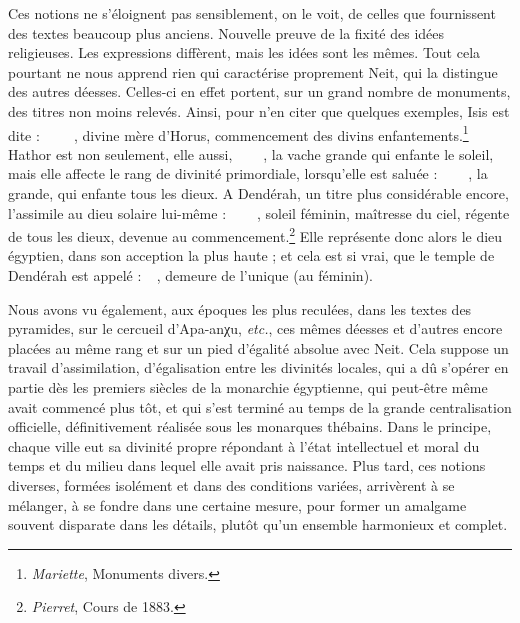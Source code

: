 \documentclass[letterpaper,twocolumn,openany,nodeprecatedcode]{dndbook}
\newcommand*\hieroAAAG{}
\newcommand*\hieroAAAH{}
\newcommand*\hieroAABC{\raisebox{0.5ex}{}}
\newcommand*\hieroAACB{\raisebox{0.5ex}{}}
\newcommand*\hieroAACN{\raisebox{1ex}{}}
\newcommand*\hieroAACS{}
\newcommand*\hieroAAEK{}
\newcommand*\hieroAAHN{}
\newcommand*\hieroAAII{}
\newcommand*\hieroAAKH{}
\newcommand*\hieroAAKO{}
\newcommand*\hieroAALA{}
\newcommand*\hieroAAMP{}
\newcommand*\hieroAANA{}
\newcommand*\hieroAANB{}
\newcommand*\hieroAANC{}
\newcommand*\hieroAANP{}
\newcommand*\hieroAAON{}
\newcommand*\hieroAAPH{}
\newcommand*\hieroAAXQ{\raisebox{0.5ex}{}}
\newcommand*\hieroAAZI{}
\newcommand*\hieroAAZN{}
\newcommand*\hieroABAM{}
\newcommand*\hieroABAN{}
\newcommand*\hieroABAO{}
\newcommand*\hieroABAP{}
\newcommand*\hieroABAQ{}
\newcommand*\hieroABAR{}
\newcommand*\hieroABAS{}
\newcommand*\hieroABAT{}
\newcommand*\hieroABAU{\raisebox{0.5ex}{}}
\begin{document}
Ces notions ne s'éloignent pas sensiblement, on le voit, de celles que fournissent des textes beaucoup plus anciens. Nouvelle preuve de la fixité des idées religieuses. Les expressions diffèrent, mais les idées sont les mêmes. Tout cela pourtant ne nous apprend rien qui caractérise proprement Neit, qui la distingue des autres déesses. Celles-ci en effet portent, sur un grand nombre de monuments, des titres non moins relevés. Ainsi, pour n'en citer que quelques exemples, Isis est dite : $\hieroAAEK\:\hieroAAKO\:\hieroAACN\allowbreak\:\hieroAAON\:\hieroAAEK\:\hieroABAM\allowbreak\:\hieroAAMP\:\hieroAAEK\allowbreak\:\hieroAANC\:\hieroABAN$, divine mère d'Horus, commencement des divins enfantements.\footnote{\emph{Mariette}, Monuments divers.} Hathor est non seulement, elle aussi, $\hieroAAAH\:\hieroAANA\:\hieroAANB\allowbreak\:\hieroAAII\:\hieroAAZI\:\hieroAANC\allowbreak\:\hieroAACS\:\hieroAAZN\:\hieroAAXQ$, la vache grande qui enfante le soleil, mais elle affecte le rang de divinité primordiale, lorsqu'elle est saluée : $\hieroAACB\:\hieroAAAG\:\hieroAAZI\allowbreak\:\hieroAANC\:\hieroAACS\:\hieroAAEK\allowbreak\:\hieroAAEK\:\hieroAAEK\:\hieroAAKH$, la grande, qui enfante tous les dieux. A Dendérah, un titre plus considérable encore, l'assimile au dieu solaire lui-même : $\hieroABAO\:\hieroAABC\:\hieroAAPH\allowbreak\:\hieroABAP\:\hieroABAQ\:\hieroABAR\allowbreak\:\hieroABAS\:\hieroAANP\:\hieroABAT$, soleil féminin, maîtresse du ciel, régente de tous les dieux, devenue au commencement.\footnote{\emph{Pierret}, Cours de 1883.} Elle représente donc alors le dieu égyptien, dans son acception la plus haute ; et cela est si vrai, que le temple de Dendérah est appelé : $\hieroAAHN\:\hieroABAU\allowbreak\:\hieroAAII\:\hieroAALA$, demeure de l'unique (au féminin).

Nous avons vu également, aux époques les plus reculées, dans les textes des pyramides, sur le cercueil d'Apa-anχu, \emph{etc.}, ces mêmes déesses et d'autres encore placées au même rang et sur un pied d'égalité absolue avec Neit. Cela suppose un travail d'assimilation, d'égalisation entre les divinités locales, qui a dû s'opérer en partie dès les premiers siècles de la monarchie égyptienne, qui peut-être même avait commencé plus tôt, et qui s'est terminé au temps de la grande centralisation officielle, définitivement réalisée sous les monarques thébains. Dans le principe, chaque ville eut sa divinité propre répondant à l'état intellectuel et moral du temps et du milieu dans lequel elle avait pris naissance. Plus tard, ces notions diverses, formées isolément et dans des conditions variées, arrivèrent à se mélanger, à se fondre dans une certaine mesure, pour former un amalgame souvent disparate dans les détails, plutôt qu'un ensemble harmonieux et complet.
\end{document}
